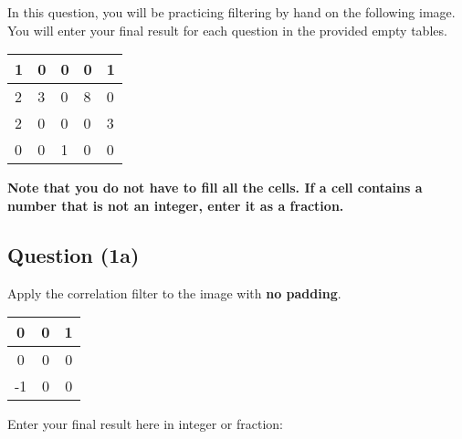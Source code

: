 \documentclass[12pt]{article}
\begin{document}

\noindent In this question, you will be practicing filtering by hand on the following image. You will enter your final result for each question in the provided empty tables.

\begin{center}
\begin{tabular}{|l|l|l|l|l|}
\hline
1 & 0 & 0 & 0 & 1 \\ \hline
2 & 3 & 0 & 8 & 0 \\ \hline
2 & 0 & 0 & 0 & 3 \\ \hline
0 & 0 & 1 & 0 & 0 \\ \hline
\end{tabular}
\end{center}
\textbf{Note that you do not have to fill all the cells. If a cell contains a number that is not an integer, enter it as a fraction.}

\subsection*{Question (1a)} Apply the correlation filter to the image with \textbf{no padding}.
\begin{center}
\begin{tabular}{|c|c|c|}
\hline
0  & 0 & 1 \\ \hline
0  & 0 & 0 \\ \hline
-1 & 0 & 0 \\ \hline
\end{tabular}
\end{center}

\noindent Enter your final result here in integer or fraction:
\end{document}

